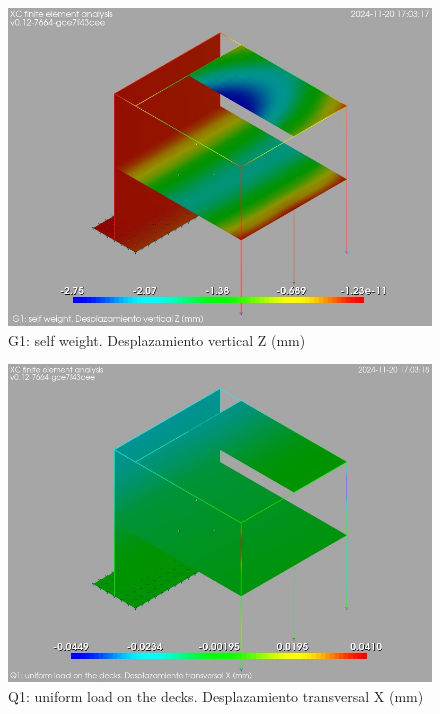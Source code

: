 \begin{figure}[ht]
\begin{center}
\includegraphics[width=\linewidth]{results/graphics/resSimplLC/GselfWeightuZ.png}
\caption{ G1: self weight. Desplazamiento vertical Z (mm)}
\label{GselfWeightuZ}
\end{center}
\end{figure}
\begin{figure}[ht]
\begin{center}
\includegraphics[width=\linewidth]{results/graphics/resSimplLC/QdecksuX.png}
\caption{Q1: uniform load on the decks. Desplazamiento transversal X (mm)}
\label{QdecksuX}
\end{center}
\end{figure}
